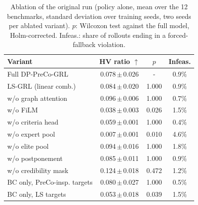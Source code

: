 \begin{table}[htbp]
\centering
\caption{Ablation of the original run (policy alone, mean over the 12 benchmarks, standard deviation over training seeds, two seeds per ablated variant). $p$: Wilcoxon test against the full model, Holm-corrected. Infeas.: share of rollouts ending in a forced-fallback violation.}
\label{tab:ablation}
\footnotesize
\setlength{\tabcolsep}{5pt}
\begin{tabular}{lccc}
\toprule
Variant & HV ratio $\uparrow$ & $p$ & Infeas. \\
\midrule
Full DP-PreCo-GRL & 0.078\,$\pm$\,0.026 & - & 0.9\% \\
LS-GRL (linear comb.) & 0.084\,$\pm$\,0.020 & 1.000 & 0.9\% \\
w/o graph attention & 0.096\,$\pm$\,0.006 & 1.000 & 0.7\% \\
w/o FiLM & 0.038\,$\pm$\,0.003 & 0.026 & 1.5\% \\
w/o criteria head & 0.059\,$\pm$\,0.001 & 1.000 & 0.4\% \\
w/o expert pool & 0.007\,$\pm$\,0.001 & 0.010 & 4.6\% \\
w/o elite pool & 0.094\,$\pm$\,0.016 & 1.000 & 1.8\% \\
w/o postponement & 0.085\,$\pm$\,0.011 & 1.000 & 0.9\% \\
w/o credibility mask & 0.124\,$\pm$\,0.018 & 0.472 & 1.2\% \\
BC only, PreCo-insp. targets & 0.080\,$\pm$\,0.027 & 1.000 & 0.5\% \\
BC only, LS targets & 0.053\,$\pm$\,0.018 & 0.039 & 1.5\% \\
\bottomrule
\end{tabular}
\end{table}
